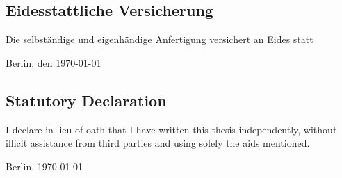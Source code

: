 \thispagestyle{empty}


{\parindent 0cm

  \subsection*{Eidesstattliche Versicherung}
Die selbst\"andige und eigenh\"andige Anfertigung versichert an Eides statt
  \vspace{3\baselineskip}  
  
  Berlin, den \today \hspace{0.25\linewidth}\parbox{0.3\linewidth}{\dotfill}

\bigskip
\subsection*{Statutory Declaration}
I declare in lieu of oath that I have written this
thesis independently, without illicit assistance
from third parties and using solely the aids
mentioned.
  \vspace{3\baselineskip}
  
  Berlin, \today \hspace{0.25\linewidth}\parbox{0.3\linewidth}{\dotfill}
}

